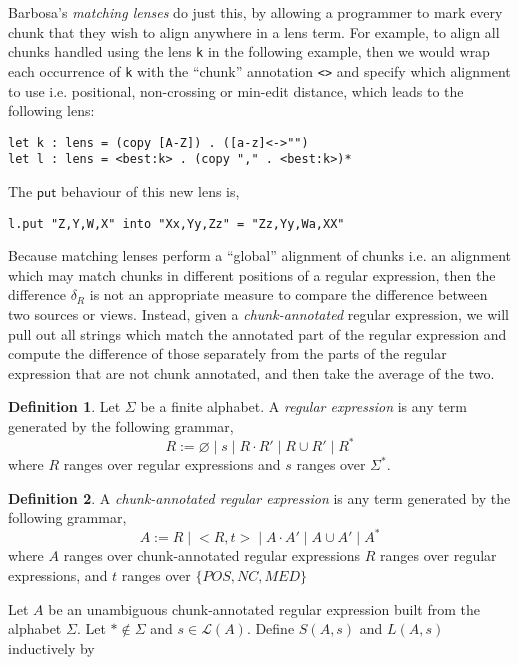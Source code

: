 \documentclass[acmsmall,review,anonymous]{acmart}\settopmatter{printfolios=true,printccs=false,printacmref=false}
\theoremstyle{definition}
\newtheorem{definition}{Definition}
\newcommand{\kw}[1]{\ensuremath{\mathsf{#1}}\xspace}
\newcommand{\pput}{\ensuremath{\kw{put}}\xspace}
\begin{document}
Barbosa's {\em matching lenses} \cite{barbosa2010matching} do just this, by allowing a programmer to mark every chunk that they wish to align anywhere in a lens term. For example, to align all chunks handled using the lens \lstinline|k| in the following example, then we would wrap each occurrence of \lstinline|k| with the ``chunk'' annotation \lstinline|<>| and specify which alignment to use i.e. positional, non-crossing or min-edit distance, which leads to the following lens:  
\begin{lstlisting}
let k : lens = (copy [A-Z]) . ([a-z]<->"")
let l : lens = <best:k> . (copy "," . <best:k>)*
\end{lstlisting}
The \pput behaviour of this new lens is,
\begin{lstlisting}
l.put "Z,Y,W,X" into "Xx,Yy,Zz" = "Zz,Yy,Wa,XX"
\end{lstlisting}
Because matching lenses perform a ``global'' alignment of chunks i.e. an alignment which may match chunks in different positions of a regular expression, then the difference $\delta_R$ is not an appropriate measure to compare the difference between two sources or views. Instead, given a {\em chunk-annotated} regular expression, we will pull out all strings which match the annotated part of the regular expression and compute the difference of those separately from the parts of the regular expression that are not chunk annotated, and then take the average of the two.
\begin{definition}
Let $\Sigma$ be a finite alphabet. A {\em regular expression} is any term generated by the following grammar,
$$R := \varnothing \; | \; s \; | \; R \cdot R' \; | \; R \cup R' \; | \; R^*$$
where $R$ ranges over regular expressions and $s$ ranges over $\Sigma^*$.
\end{definition}
\begin{definition}
A {\em chunk-annotated regular expression} is any term generated by the following grammar,
$$A := R \; | \; <R,t> \; | \; A \cdot A' \; | \; A \cup A' \; | \; A^*$$
where $A$ ranges over chunk-annotated regular expressions $R$ ranges over regular expressions, and $t$ ranges over $\{POS,NC,MED\}$
\end{definition}
Let $A$ be an unambiguous chunk-annotated regular expression built from the alphabet $\Sigma$. Let $* \not \in \Sigma$ and $s \in \mathcal{L}(A)$. Define $S(A, s)$ and $L(A, s)$ inductively by
\end{document}
